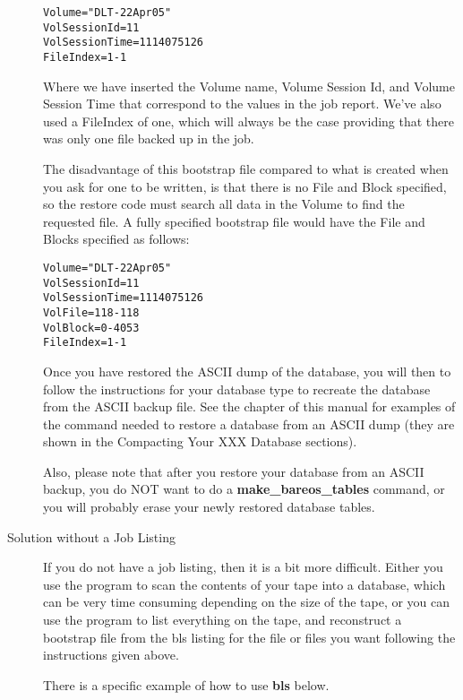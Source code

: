 \begin{description}
\footnotesize
\begin{verbatim}
Volume="DLT-22Apr05"
VolSessionId=11
VolSessionTime=1114075126
FileIndex=1-1
\end{verbatim}
\normalsize

  Where we have inserted the Volume name, Volume Session Id, and Volume
  Session Time that correspond to the values in the job report.  We've also
  used a FileIndex of one, which will always be the case providing that
  there was only one file backed up in the job.

  The disadvantage of this bootstrap file compared to what is created when
  you ask for one to be written, is that there is no File and Block
  specified, so the restore code must search all data in the Volume to find
  the requested file.  A fully specified bootstrap file would have the File
  and Blocks specified as follows:

\footnotesize
\begin{verbatim}
Volume="DLT-22Apr05"
VolSessionId=11
VolSessionTime=1114075126
VolFile=118-118
VolBlock=0-4053
FileIndex=1-1
\end{verbatim}
\normalsize

   Once you have restored the ASCII dump of the database,
   you will then to follow the instructions for your
   database type to recreate the database from the ASCII backup file.
   See the  chapter of
   this manual for examples of the command needed to restore a
   database from an ASCII dump (they are shown in the Compacting Your
   XXX Database sections).

   Also, please note that after you restore your database from an ASCII
   backup, you do NOT want to do a {\bf make\_bareos\_tables}  command, or
   you will probably erase your newly restored database tables.

\item [Solution without a Job Listing]
   If you do not have a job listing, then it is a bit more difficult.
   Either you use the  program to scan the contents
   of your tape into a database, which can be very time consuming
   depending on the size of the tape, or you can use the 
   program to list everything on the tape, and reconstruct a bootstrap
   file from the bls listing for the file or files you want following
   the instructions given above.

   There is a specific example of how to use {\bf bls} below.


\end{description}
